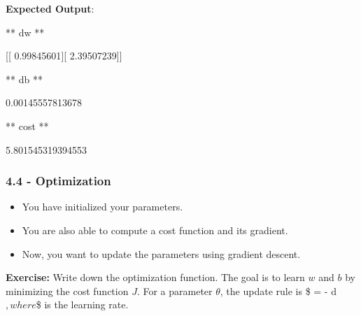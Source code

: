 \documentclass[11pt]{article}
\begin{document}
    \textbf{Expected Output}:

** dw **

{[}{[} 0.99845601{]}{[} 2.39507239{]}{]}

** db **

0.00145557813678

** cost **

5.801545319394553

    \subsubsection{4.4 - Optimization}\label{optimization}

\begin{itemize}
\itemsep1pt\parskip0pt
\item
  You have initialized your parameters.
\item
  You are also able to compute a cost function and its gradient.
\item
  Now, you want to update the parameters using gradient descent.
\end{itemize}

\textbf{Exercise:} Write down the optimization function. The goal is to
learn $w$ and $b$ by minimizing the cost function $J$. For a parameter
$\theta$, the update rule is \$ \theta = \theta - \alpha \text{ }
d\theta$, where $\alpha\$ is the learning rate.
\end{document}
